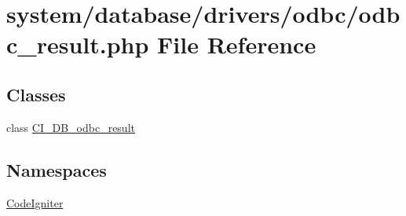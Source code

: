 \hypertarget{odbc__result_8php}{}\section{system/database/drivers/odbc/odbc\+\_\+result.php File Reference}
\label{odbc__result_8php}
\subsection*{Classes}
\begin{DoxyCompactItemize}
\item 
class \mbox{\hyperlink{class_c_i___d_b__odbc__result}{C\+I\+\_\+\+D\+B\+\_\+odbc\+\_\+result}}
\end{DoxyCompactItemize}
\subsection*{Namespaces}
\begin{DoxyCompactItemize}
\item 
 \mbox{\hyperlink{namespace_code_igniter}{Code\+Igniter}}
\end{DoxyCompactItemize}
